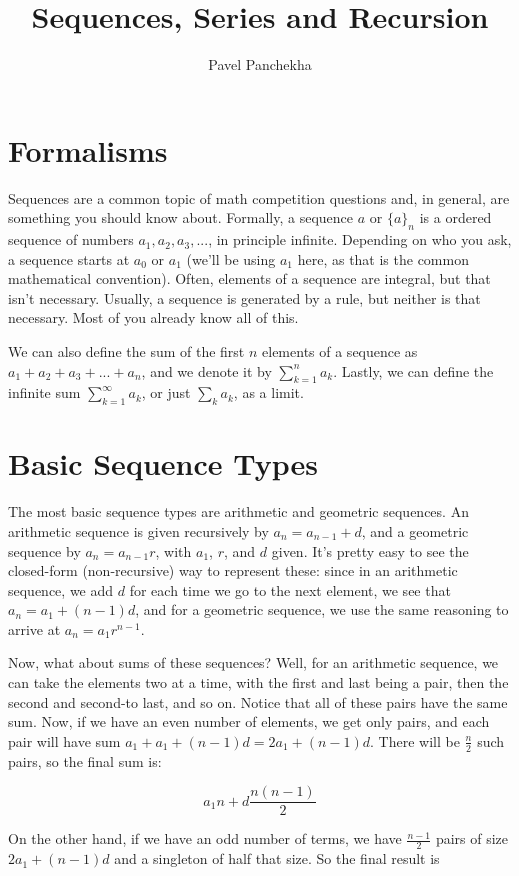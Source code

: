 \documentclass[12pt,letterpaper]{article}
\author{Pavel Panchekha}
\title{Sequences, Series and Recursion}
\begin{document}
\maketitle

\section{Formalisms}
Sequences are a common topic of math competition questions and, in
general, are something you should know about. Formally, a sequence $a$ or
$\{a\}_n$ is a ordered sequence of numbers $a_1, a_2, a_3, ...$, in
principle infinite. Depending on who you ask, a sequence starts at
$a_0$ or $a_1$ (we'll be using $a_1$ here, as that is the common
mathematical convention). Often, elements of a sequence are integral,
but that isn't necessary. Usually, a sequence is generated by a rule,
but neither is that necessary. Most of you already know all of this.

We can also define the sum of the first $n$ elements of a sequence as
$a_1 + a_2 + a_3 + ... + a_n$, and we denote it by $\sum_{k=1}^n a_k$.
Lastly, we can define the infinite sum $\sum_{k=1}^\infty a_k$, or
just $\sum_k a_k$, as a limit.

\section{Basic Sequence Types}
The most basic sequence types are arithmetic and geometric sequences.
An arithmetic sequence is given recursively by $a_n = a_{n-1} + d$,
and a geometric sequence by $a_n = a_{n-1} r$, with $a_1$, $r$, and
$d$ given. It's pretty easy to see the closed-form (non-recursive) way
to represent these: since in an arithmetic sequence, we add $d$ for
each time we go to the next element, we see that $a_n = a_1 + (n - 1)
d$, and for a geometric sequence, we use the same reasoning to arrive
at $a_n = a_1 r^{n - 1}$.

Now, what about sums of these sequences? Well, for an arithmetic
sequence, we can take the elements two at a time, with the first and
last being a pair, then the second and second-to last, and so
on. Notice that all of these pairs have the same sum. Now, if we have
an even number of elements, we get only pairs, and each pair will have
sum $a_1 + a_1 + (n - 1) d = 2 a_1 + (n - 1) d$. There will be
$\frac{n}{2}$ such pairs, so the final sum is:

$$a_1 n + d \frac{n (n-1)}{2}$$

On the other hand, if we have an odd number of terms, we have
$\frac{n-1}{2}$ pairs of size $2 a_1 + (n - 1) d$ and a singleton of
half that size. So the final result is
\end{document}
